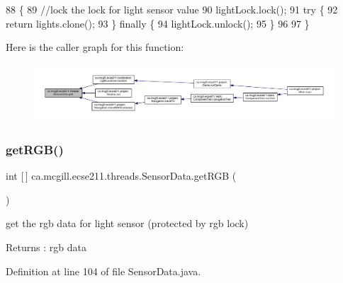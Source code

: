 \begin{DoxyCode}
88                          \{    
89     \textcolor{comment}{//lock the lock for light sensor value}
90     lightLock.lock();
91     \textcolor{keywordflow}{try} \{
92       \textcolor{keywordflow}{return} lights.clone();
93     \} \textcolor{keywordflow}{finally} \{
94       lightLock.unlock();
95     \}
96     
97   \}
\end{DoxyCode}
Here is the caller graph for this function\+:\nopagebreak
\begin{figure}[H]
\begin{center}
\leavevmode
\includegraphics[width=350pt]{classca_1_1mcgill_1_1ecse211_1_1threads_1_1_sensor_data_a39eec50582f0e4bcff8a4669c48e1609_icgraph}
\end{center}
\end{figure}
\mbox{\label{classca_1_1mcgill_1_1ecse211_1_1threads_1_1_sensor_data_a76313564e284f5cdb66aefce4e595f3b}} 
\subsubsection{\texorpdfstring{get\+R\+G\+B()}{getRGB()}}
{\footnotesize\ttfamily int \mbox{[}$\,$\mbox{]} ca.\+mcgill.\+ecse211.\+threads.\+Sensor\+Data.\+get\+R\+GB (\begin{DoxyParamCaption}{ }\end{DoxyParamCaption})}

get the rgb data for light sensor (protected by rgb lock)

\begin{DoxyReturn}{Returns}
\+: rgb data 
\end{DoxyReturn}


Definition at line 104 of file Sensor\+Data.\+java.


